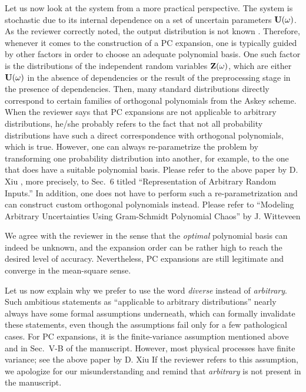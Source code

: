 \begin{authors}
Let us now look at the system from a more practical perspective.
The system is stochastic due to its internal dependence on a set of uncertain parameters $\mathbf{U}(\omega)$.
As the reviewer correctly noted, the output distribution is not known \apriori.
Therefore, whenever it comes to the construction of a PC expansion, one is typically guided by other factors in order to choose an adequate polynomial basis.
One such factor is the distributions of the independent random variables $\mathbf{Z}(\omega)$, which are either $\mathbf{U}(\omega)$ in the absence of dependencies or the result of the preprocessing stage in the presence of dependencies.
Then, many standard distributions directly correspond to certain families of orthogonal polynomials from the Askey scheme.
When the reviewer says that PC expansions are not applicable to arbitrary distributions, he/she probably refers to the fact that not all probability distributions have such a direct correspondence with orthogonal polynomials, which is true.
However, one can always re-parametrize the problem by transforming one probability distribution into another, for example, to the one that does have a suitable polynomial basis.
Please refer to the above paper by D. Xiu \etal, more precisely, to Sec.~6 titled ``Representation of Arbitrary Random Inputs.''
In addition, one does not have to perform such a re-parametrization and can construct custom orthogonal polynomials instead.
Please refer to ``Modeling Arbitrary Uncertainties Using Gram-Schmidt Polynomial Chaos'' by J. Witteveen \etal

We agree with the reviewer in the sense that the \emph{optimal} polynomial basis can indeed be unknown, and the expansion order can be rather high to reach the desired level of accuracy.
Nevertheless, PC expansions are still legitimate and converge in the mean-square sense.

Let us now explain why we prefer to use the word \emph{diverse} instead of \emph{arbitrary}.
Such ambitious statements as ``applicable to arbitrary distributions'' nearly always have some formal assumptions underneath, which can formally invalidate these statements, even though the assumptions fail only for a few pathological cases.
For PC expansions, it is the finite-variance assumption mentioned above and in Sec.~V-B of the manuscript.
However, most physical processes have finite variance; see the above paper by D. Xiu \etal{}
If the reviewer refers to this assumption, we apologize for our misunderstanding and remind that \emph{arbitrary} is not present in the manuscript.

\begin{actions}
\end{actions}
\end{authors}

